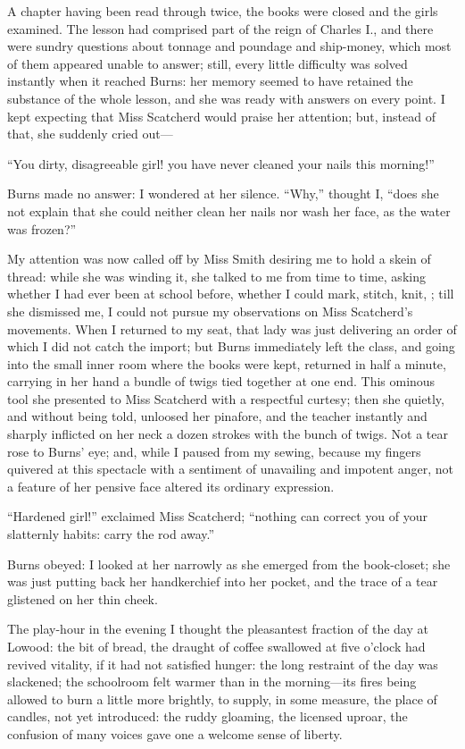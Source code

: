 A chapter having been read through twice, the books were closed and the
girls examined.  The lesson had comprised part of the reign of Charles
I., and there were sundry questions about tonnage and poundage and
ship-money, which most of them appeared unable to answer; still, every
little difficulty was solved instantly when it reached Burns: her memory
seemed to have retained the substance of the whole lesson, and she was
ready with answers on every point.  I kept expecting that Miss Scatcherd
would praise her attention; but, instead of that, she suddenly cried
out---

\enquote{You dirty, disagreeable girl! you have never cleaned your nails
this morning!}

Burns made no answer: I wondered at her silence.  \enquote{Why,} thought
I, \enquote{does she not explain that she could neither clean her nails
nor wash her face, as the water was frozen?}

My attention was now called off by Miss Smith desiring me to hold a
skein of thread: while she was winding it, she talked to me from time to
time, asking whether I had ever been at school before, whether I could
mark, stitch, knit, \etc; till she dismissed me, I could not pursue my
observations on Miss Scatcherd's movements.  When I returned to my seat,
that lady was just delivering an order of which I did not catch the
import; but Burns immediately left the class, and going into the small
inner room where the books were kept, returned in half a minute,
carrying in her hand a bundle of twigs tied together at one end.  This
ominous tool she presented to Miss Scatcherd with a respectful curtesy;
then she quietly, and without being told, unloosed her pinafore, and the
teacher instantly and sharply inflicted on her neck a dozen strokes with
the bunch of twigs.  Not a tear rose to Burns' eye; and, while I paused
from my sewing, because my fingers quivered at this spectacle with a
sentiment of unavailing and impotent anger, not a feature of her pensive
face altered its ordinary expression.

\enquote{Hardened girl!} exclaimed Miss Scatcherd; \enquote{nothing can
correct you of your slatternly habits: carry the rod away.}

Burns obeyed: I looked at her narrowly as she emerged from the
book-closet; she was just putting back her handkerchief into her pocket,
and the trace of a tear glistened on her thin cheek.

The play-hour in the evening I thought the pleasantest fraction of the
day at Lowood: the bit of bread, the draught of coffee swallowed at five
o'clock had revived vitality, if it had not satisfied hunger: the long
restraint of the day was slackened; the schoolroom felt warmer than in
the morning---its fires being allowed to burn a little more brightly, to
supply, in some measure, the place of candles, not yet introduced: the
ruddy gloaming, the licensed uproar, the confusion of many voices gave
one a welcome sense of liberty.

